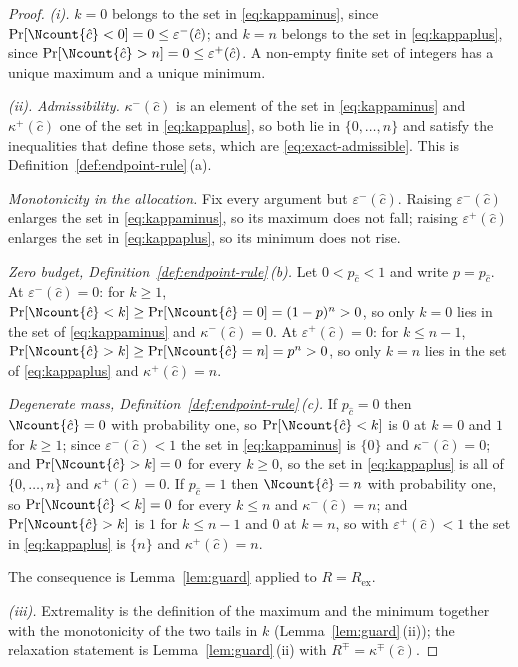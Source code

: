 \begin{proof}
\emph{(i).} $k=0$ belongs to the set in \eqref{eq:kappaminus}, since
$\Pr[\Ncount{\hat c}<0]=0\le\varepsilon^{-}(\hat c)$; and $k=n$ belongs to the
set in \eqref{eq:kappaplus}, since
$\Pr[\Ncount{\hat c}>n]=0\le\varepsilon^{+}(\hat c)$. A non-empty finite set of
integers has a unique maximum and a unique minimum.

\emph{(ii).} \emph{Admissibility.} $\kappa^{-}(\hat c)$ is an element of the
set in \eqref{eq:kappaminus} and $\kappa^{+}(\hat c)$ one of the set in
\eqref{eq:kappaplus}, so both lie in $\{0,\dots,n\}$ and satisfy the
inequalities that define those sets, which are \eqref{eq:exact-admissible}.
This is Definition~\ref{def:endpoint-rule}\,(a).

\emph{Monotonicity in the allocation.} Fix every argument but
$\varepsilon^{-}(\hat c)$. Raising $\varepsilon^{-}(\hat c)$ enlarges the set
in \eqref{eq:kappaminus}, so its maximum does not fall; raising
$\varepsilon^{+}(\hat c)$ enlarges the set in \eqref{eq:kappaplus}, so its
minimum does not rise.

\emph{Zero budget, Definition~\ref{def:endpoint-rule}\,(b).} Let
$0<p_{\hat c}<1$ and write $p=p_{\hat c}$. At $\varepsilon^{-}(\hat c)=0$:
for $k\ge1$, $\Pr[\Ncount{\hat c}<k]\ge\Pr[\Ncount{\hat c}=0]=(1-p)^{n}>0$, so
only $k=0$ lies in the set of \eqref{eq:kappaminus} and
$\kappa^{-}(\hat c)=0$. At $\varepsilon^{+}(\hat c)=0$: for $k\le n-1$,
$\Pr[\Ncount{\hat c}>k]\ge\Pr[\Ncount{\hat c}=n]=p^{n}>0$, so only $k=n$ lies
in the set of \eqref{eq:kappaplus} and $\kappa^{+}(\hat c)=n$.

\emph{Degenerate mass, Definition~\ref{def:endpoint-rule}\,(c).} If
$p_{\hat c}=0$ then $\Ncount{\hat c}=0$ with probability one, so
$\Pr[\Ncount{\hat c}<k]$ is $0$ at $k=0$ and $1$ for $k\ge1$; since
$\varepsilon^{-}(\hat c)<1$ the set in \eqref{eq:kappaminus} is $\{0\}$ and
$\kappa^{-}(\hat c)=0$; and $\Pr[\Ncount{\hat c}>k]=0$ for every $k\ge0$, so
the set in \eqref{eq:kappaplus} is all of $\{0,\dots,n\}$ and
$\kappa^{+}(\hat c)=0$. If $p_{\hat c}=1$ then $\Ncount{\hat c}=n$ with
probability one, so $\Pr[\Ncount{\hat c}<k]=0$ for every $k\le n$ and
$\kappa^{-}(\hat c)=n$; and $\Pr[\Ncount{\hat c}>k]$ is $1$ for $k\le n-1$ and
$0$ at $k=n$, so with $\varepsilon^{+}(\hat c)<1$ the set in
\eqref{eq:kappaplus} is $\{n\}$ and $\kappa^{+}(\hat c)=n$.

The consequence is Lemma~\ref{lem:guard} applied to $R=R_{\mathrm{ex}}$.

\emph{(iii).} Extremality is the definition of the maximum and the minimum
together with the monotonicity of the two tails in $k$
(Lemma~\ref{lem:guard}\,(ii)); the relaxation statement is
Lemma~\ref{lem:guard}\,(ii) with $R^{\mp}=\kappa^{\mp}(\hat c)$.


\end{proof}
